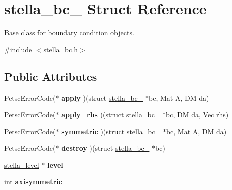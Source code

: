 \hypertarget{structstella__bc__}{}\section{stella\+\_\+bc\+\_\+ Struct Reference}
\label{structstella__bc__}


Base class for boundary condition objects.  




{\ttfamily \#include $<$stella\+\_\+bc.\+h$>$}

\subsection*{Public Attributes}
\begin{DoxyCompactItemize}
\item 
\mbox{\label{structstella__bc___a5b1d149d37c0630504c36a4dc3ae5e9d}} 
Petsc\+Error\+Code($\ast$ {\bfseries apply} )(struct \mbox{\hyperlink{structstella__bc__}{stella\+\_\+bc\+\_\+}} $\ast$bc, Mat A, DM da)
\item 
\mbox{\label{structstella__bc___ab7ce4435d89288faf2913fa55cd44fb7}} 
Petsc\+Error\+Code($\ast$ {\bfseries apply\+\_\+rhs} )(struct \mbox{\hyperlink{structstella__bc__}{stella\+\_\+bc\+\_\+}} $\ast$bc, DM da, Vec rhs)
\item 
\mbox{\label{structstella__bc___a52d038c098ef52238c994fb1a04062ee}} 
Petsc\+Error\+Code($\ast$ {\bfseries symmetric} )(struct \mbox{\hyperlink{structstella__bc__}{stella\+\_\+bc\+\_\+}} $\ast$bc, Mat A, DM da)
\item 
\mbox{\label{structstella__bc___a4557b392d86abf64d786ed0b7f98c064}} 
Petsc\+Error\+Code($\ast$ {\bfseries destroy} )(struct \mbox{\hyperlink{structstella__bc__}{stella\+\_\+bc\+\_\+}} $\ast$bc)
\item 
\mbox{\label{structstella__bc___aedec7c12ca10923dce08b29326b46196}} 
\mbox{\hyperlink{structstella__level}{stella\+\_\+level}} $\ast$ {\bfseries level}
\item 
\mbox{\label{structstella__bc___a16871bbe5781bbb75da7803993796ea2}} 
int {\bfseries axisymmetric}
\item 

\end{DoxyCompactItemize}
